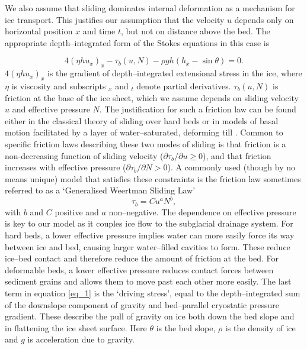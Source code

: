\documentclass[journal abbreviation, manuscript]{copernicus}
\begin{document}
We also assume that sliding dominates internal deformation as a mechanism for ice transport. This justifies our assumption that the velocity $u$  
depends only on horizontal position $x$ and time $t$, but not on distance 
above the bed.
The appropriate depth--integrated 
form of the Stokes equations in this case is \citep{macayeal1989large, schoof2010thin}

\begin{equation} \label{eq_1}
4 (\eta h u_x)_x - \tau_b (u,N) - \rho g h ( h_x - \sin \theta ) = 0.
\end{equation}
$4(\eta h u_x)_x$ is the gradient 
of depth--integrated extensional stress in the ice, where $\eta$ is 
viscosity and subscripts $_x$ and $_t$ denote partial derivatives. 
$\tau_b(u,N)$ is friction at the base of the 
ice sheet, which we assume depends on sliding velocity $u$ and  
effective pressure $N$. The justification for such a friction law can be 
found either in the classical theory of sliding over hard beds \citep{lliboutry1968general, budd1979empirical, bindschadler1983importance, fowler1986sliding, fowler1987sliding}
or 
in models of basal motion facilitated by a layer of water--saturated, 
deforming till \citep{blankenship1987till, boulton1987sediment, kamb1991rheological, iverson1998ring}.
Common to specific friction laws describing these two modes of
sliding is that friction is a non-decreasing function of sliding 
velocity ($\partial \tau_b/\partial u \geq 0$), and that friction 
increases with effective pressure ($\partial \tau_b/\partial N > 0$). A 
commonly used (though by no means unique) model that satisfies these 
constraints is the friction law sometimes referred to as a `Generalised Weertman Sliding Law'
$$ \tau_b = C u^a N^b, $$
with $b$ and $C$ positive and $a$ non--negative.  The dependence on 
effective pressure is key to our model as it couples ice flow to the subglacial drainage system. For hard beds, a lower effective 
pressure implies water can more easily force its way between ice 
and bed, causing larger water--filled cavities to form. These reduce 
ice--bed contact and therefore reduce the amount of friction at the bed. For
deformable beds, a lower effective pressure reduces contact forces 
between sediment grains and allows them to move past each other more 
easily.
The last term in equation \eqref{eq_1} is the `driving 
stress', equal to the depth--integrated sum of the downslope component of 
gravity and bed--parallel
cryostatic pressure gradient. These describe the pull of gravity on ice both down the bed slope and in flattening the ice sheet surface. Here $\theta$ is the bed slope, $\rho$ is 
the density of ice and $g$ is acceleration due to gravity.
\end{document}
